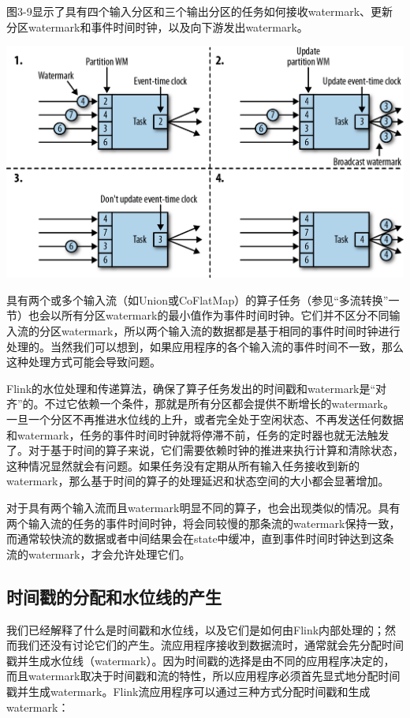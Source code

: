 \documentclass[cn,11pt,chinese]{elegantbook}
\begin{document}
图3-9显示了具有四个输入分区和三个输出分区的任务如何接收watermark、更新分区watermark和事件时间时钟，以及向下游发出watermark。

\includegraphics{images/spaf_0309.png}

具有两个或多个输入流（如Union或CoFlatMap）的算子任务（参见``多流转换''一节）也会以所有分区watermark的最小值作为事件时间时钟。它们并不区分不同输入流的分区watermark，所以两个输入流的数据都是基于相同的事件时间时钟进行处理的。当然我们可以想到，如果应用程序的各个输入流的事件时间不一致，那么这种处理方式可能会导致问题。

Flink的水位处理和传递算法，确保了算子任务发出的时间戳和watermark是``对齐''的。不过它依赖一个条件，那就是所有分区都会提供不断增长的watermark。一旦一个分区不再推进水位线的上升，或者完全处于空闲状态、不再发送任何数据和watermark，任务的事件时间时钟就将停滞不前，任务的定时器也就无法触发了。对于基于时间的算子来说，它们需要依赖时钟的推进来执行计算和清除状态，这种情况显然就会有问题。如果任务没有定期从所有输入任务接收到新的watermark，那么基于时间的算子的处理延迟和状态空间的大小都会显著增加。

对于具有两个输入流而且watermark明显不同的算子，也会出现类似的情况。具有两个输入流的任务的事件时间时钟，将会同较慢的那条流的watermark保持一致，而通常较快流的数据或者中间结果会在state中缓冲，直到事件时间时钟达到这条流的watermark，才会允许处理它们。

\hypertarget{ux65f6ux95f4ux6233ux7684ux5206ux914dux548cux6c34ux4f4dux7ebfux7684ux4ea7ux751f}{%
\subsection{时间戳的分配和水位线的产生}\label{ux65f6ux95f4ux6233ux7684ux5206ux914dux548cux6c34ux4f4dux7ebfux7684ux4ea7ux751f}}

我们已经解释了什么是时间戳和水位线，以及它们是如何由Flink内部处理的；然而我们还没有讨论它们的产生。流应用程序接收到数据流时，通常就会先分配时间戳并生成水位线（watermark）。因为时间戳的选择是由不同的应用程序决定的，而且watermark取决于时间戳和流的特性，所以应用程序必须首先显式地分配时间戳并生成watermark。Flink流应用程序可以通过三种方式分配时间戳和生成watermark：
\end{document}

